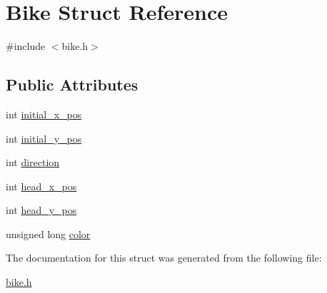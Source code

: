\hypertarget{structBike}{}\section{Bike Struct Reference}
\label{structBike}


{\ttfamily \#include $<$bike.\+h$>$}

\subsection*{Public Attributes}
\begin{DoxyCompactItemize}
\item 
int \hyperlink{group__Bike_ga01cdf583ace46bc4e576c42b54ee628a}{initial\+\_\+x\+\_\+pos}
\item 
int \hyperlink{group__Bike_ga74f0f95635444a7570225a75f3a22056}{initial\+\_\+y\+\_\+pos}
\item 
int \hyperlink{group__Bike_ga9a5251a8d520f2ce0fc0e34dd7325a23}{direction}
\item 
int \hyperlink{group__Bike_ga3187c35b871d499fb88aca98de35282a}{head\+\_\+x\+\_\+pos}
\item 
int \hyperlink{group__Bike_ga48e90acd4f7eceb4ea0921f9a8b89f98}{head\+\_\+y\+\_\+pos}
\item 
unsigned long \hyperlink{group__Bike_ga7ba066e0787d8b239b8cb16775db0eac}{color}
\end{DoxyCompactItemize}


The documentation for this struct was generated from the following file\+:\begin{DoxyCompactItemize}
\item 
\hyperlink{bike_8h}{bike.\+h}\end{DoxyCompactItemize}
